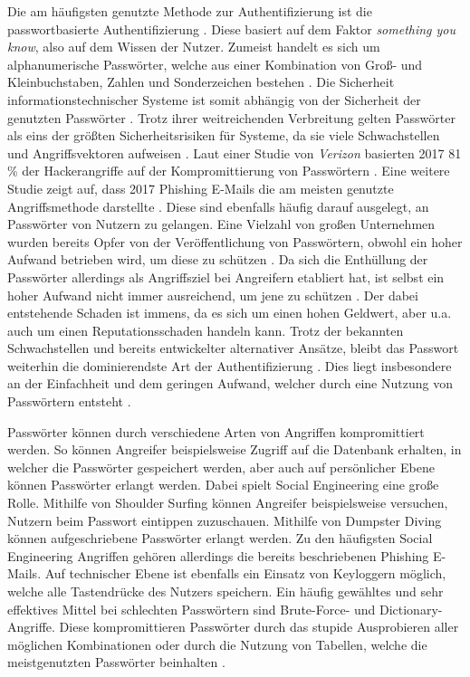     Die am häufigsten genutzte Methode zur Authentifizierung ist die passwortbasierte Authentifizierung \cite{boonkrong2012security} \cite{chanda2016password} \cite{yildirim2019encouraging}. Diese basiert auf dem Faktor \textit{something you know}, also auf dem Wissen der Nutzer. Zumeist handelt es sich um alphanumerische Passwörter, welche aus einer Kombination von Groß- und Kleinbuchstaben, Zahlen und Sonderzeichen bestehen \cite{chanda2016password}. Die Sicherheit informationstechnischer Systeme ist somit abhängig von der Sicherheit der genutzten Passwörter \cite{boonkrong2012security}. Trotz ihrer weitreichenden Verbreitung gelten Passwörter als eins der größten Sicherheitsrisiken für Systeme, da sie viele Schwachstellen und Angriffsvektoren aufweisen \cite{yildirim2019encouraging} \cite{farke2020you}. Laut einer Studie von \textit{Verizon} basierten 2017 81 \% der Hackerangriffe auf der Kompromittierung von Passwörtern \cite{barbosa2021provable} \cite{verizon2017}. Eine weitere Studie zeigt auf, dass 2017 Phishing E-Mails die am meisten genutzte Angriffsmethode darstellte \cite{Symantec} \cite{barbosa2021provable}. Diese sind ebenfalls häufig darauf ausgelegt, an Passwörter von Nutzern zu gelangen. Eine Vielzahl von großen Unternehmen wurden bereits Opfer von der Veröffentlichung von Passwörtern, obwohl ein hoher Aufwand betrieben wird, um diese zu schützen \cite{boonkrong2012security}. Da sich die Enthüllung der Passwörter allerdings als Angriffsziel bei Angreifern etabliert hat, ist selbst ein hoher Aufwand nicht immer ausreichend, um jene zu schützen \cite{boonkrong2012security}. Der dabei entstehende Schaden ist immens, da es sich um einen hohen Geldwert, aber u.a. auch um einen Reputationsschaden handeln kann. Trotz der bekannten Schwachstellen und bereits entwickelter alternativer Ansätze, bleibt das Passwort weiterhin die dominierendste Art der Authentifizierung \cite{ives2004domino}. Dies liegt insbesondere an der Einfachheit und dem geringen Aufwand, welcher durch eine Nutzung von Passwörtern entsteht \cite{yildirim2019encouraging}.

    Passwörter können durch verschiedene Arten von Angriffen kompromittiert werden. So können Angreifer beispielsweise Zugriff auf die Datenbank erhalten, in welcher die Passwörter gespeichert werden, aber auch auf persönlicher Ebene können Passwörter erlangt werden. Dabei spielt Social Engineering eine große Rolle. Mithilfe von Shoulder Surfing können Angreifer beispielsweise versuchen, Nutzern beim Passwort eintippen zuzuschauen. Mithilfe von Dumpster Diving können aufgeschriebene Passwörter erlangt werden. Zu den häufigsten Social Engineering Angriffen gehören allerdings die bereits beschriebenen Phishing E-Mails. Auf technischer Ebene ist ebenfalls ein Einsatz von Keyloggern möglich, welche alle Tastendrücke des Nutzers speichern. Ein häufig gewähltes und sehr effektives Mittel bei schlechten Passwörtern sind Brute-Force- und Dictionary-Angriffe. Diese kompromittieren Passwörter durch das stupide Ausprobieren aller möglichen Kombinationen oder durch die Nutzung von Tabellen, welche die meistgenutzten Passwörter beinhalten \cite{chanda2016password} \cite{morii2017research}.

